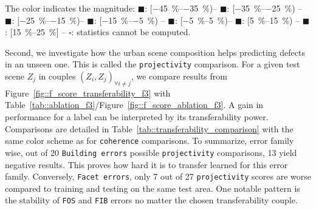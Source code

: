 \begin{table}[htbp]
{                The color indicates the magnitude: \textcolor{LOSS3545}{$\blacksquare$}: [\SIrange[range-phrase={, }]{-45}{-35}{\percent})--
                \textcolor{LOSS2535}{$\blacksquare$}: [\SIrange[range-phrase={, }]{-35}{-25}{\percent}) --
                \textcolor{LOSS1525}{$\blacksquare$}: [\SIrange[range-phrase={, }]{-25}{-15}{\percent})--
                \textcolor{LOSS0515}{$\blacksquare$}: [\SIrange[range-phrase={, }]{-15}{-5}{\percent}) --
                \textcolor{STBL}{$\blacksquare$}: [\SIrange[range-phrase={, }]{-5}{5}{\percent})--
                \textcolor{GAIN0515}{$\blacksquare$}: [\SIrange[range-phrase={, }]{5}{15}{\percent}) --
                \textcolor{GAIN1525}{$\blacksquare$}: [\SIrange[range-phrase={, }]{15}{25}{\percent}] --
                $\square$: statistics cannot be computed.
            }
        \end{table}

        Second, we investigate how the urban scene composition helps predicting defects in an unseen one.
        This is called the \texttt{projectivity} comparison.
        For a given test scene $Z_j$ in couples $(Z_i, Z_j)_{\forall i \neq j}$, we compare results from Figure~\ref{fig::f_score_transferability_f3} with Table~\ref{tab::ablation_f3}/Figure~\ref{fig::f_score_ablation_f3}.
        A gain in performance for a label can be interpreted by its transferability power.\\

        Comparisons are detailed in Table~\ref{tab::transferability_comparison} with the same color scheme as for \texttt{coherence} comparisons.
        To summarize, error family wise, out of 20 \texttt{Building errors} possible \texttt{projectivity} comparisons, 13 yield negative results.
        This proves how hard it is to transfer learned for this error family.
        Conversely, \texttt{Facet errors}, only 7 out of 27 \texttt{projectivity} scores are worse compared to training and testing on the same test area.
        One notable pattern is the stability of \texttt{FOS} and \texttt{FIB} errors no matter the chosen transferability couple.\\


